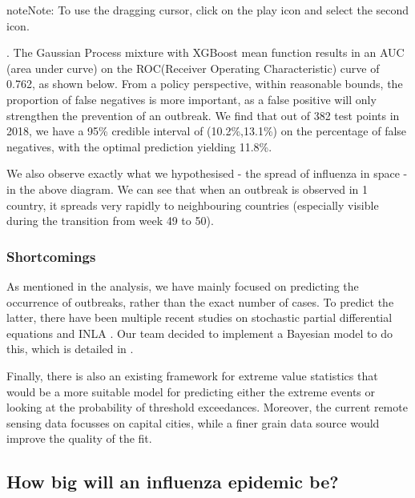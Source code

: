 \documentclass[letterpaper,10pt,english]{sphinxmanual}
\begin{document}
\begin{sphinxadmonition}{note}{Note:}
To use the dragging cursor, click on the play icon and select the second icon.
\end{sphinxadmonition}



. The Gaussian Process mixture with XGBoost mean function results in an AUC (area under curve) on the ROC(Receiver Operating Characteristic) curve of 0.762, as shown below. From a policy perspective, within reasonable bounds, the proportion of false negatives is more important, as a false positive will only strengthen the prevention of an outbreak. We find that out of 382 test points in 2018, we have a 95\% credible interval of (10.2\%,13.1\%) on the percentage of false negatives, with the optimal prediction yielding 11.8\%.

\noindent{}

We also observe exactly what we hypothesised - the spread of influenza in space - in the above diagram. We can see that when an outbreak is observed in 1 country, it spreads very rapidly to neighbouring countries (especially visible during the transition from week 49 to 50).


\subsubsection{Shortcomings}
\label{\detokenize{models/when:shortcomings}}
As mentioned in the analysis, we have mainly focused on predicting the occurrence of outbreaks, rather than the exact number of cases. To predict the latter, there have been multiple recent studies on stochastic partial differential equations and INLA \sphinxfootnotemark[8]. Our team decided to implement a Bayesian model to do this, which is detailed in {\hyperref[\detokenize{models/how_big:bayesian}]{}}.

Finally, there is also an existing framework for extreme value statistics that would be a more suitable model for predicting either the extreme events or looking at the probability of threshold exceedances. Moreover, the current remote sensing data focusses on capital cities, while a finer grain data source would improve the quality of the fit.


\subsection{How big will an influenza epidemic be?}
\label{\detokenize{models/how_big:how-big-will-an-influenza-epidemic-be}}\label{\detokenize{models/how_big:bayesian}}\label{\detokenize{models/how_big::doc}}
\end{document}
